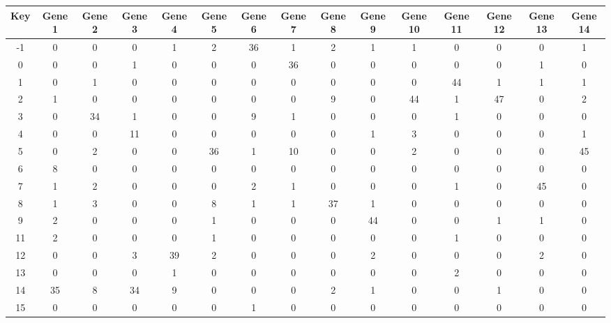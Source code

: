 \begin{tabular}{|c|c|c|c|c|c|c|c|c|c|c|c|c|c|c|}
\hline
Key & Gene 1 & Gene 2 & Gene 3 & Gene 4 & Gene 5 & Gene 6 & Gene 7 & Gene 8 & Gene 9 & Gene 10 & Gene 11 & Gene 12 & Gene 13 & Gene 14 \\
\hline
-1 & 0 & 0 & 0 & 1 & 2 & 36 & 1 & 2 & 1 & 1 & 0 & 0 & 0 & 1 \\
0 & 0 & 0 & 1 & 0 & 0 & 0 & 36 & 0 & 0 & 0 & 0 & 0 & 1 & 0 \\
1 & 0 & 1 & 0 & 0 & 0 & 0 & 0 & 0 & 0 & 0 & 44 & 1 & 1 & 1 \\
2 & 1 & 0 & 0 & 0 & 0 & 0 & 0 & 9 & 0 & 44 & 1 & 47 & 0 & 2 \\
3 & 0 & 34 & 1 & 0 & 0 & 9 & 1 & 0 & 0 & 0 & 1 & 0 & 0 & 0 \\
4 & 0 & 0 & 11 & 0 & 0 & 0 & 0 & 0 & 1 & 3 & 0 & 0 & 0 & 1 \\
5 & 0 & 2 & 0 & 0 & 36 & 1 & 10 & 0 & 0 & 2 & 0 & 0 & 0 & 45 \\
6 & 8 & 0 & 0 & 0 & 0 & 0 & 0 & 0 & 0 & 0 & 0 & 0 & 0 & 0 \\
7 & 1 & 2 & 0 & 0 & 0 & 2 & 1 & 0 & 0 & 0 & 1 & 0 & 45 & 0 \\
8 & 1 & 3 & 0 & 0 & 8 & 1 & 1 & 37 & 1 & 0 & 0 & 0 & 0 & 0 \\
9 & 2 & 0 & 0 & 0 & 1 & 0 & 0 & 0 & 44 & 0 & 0 & 1 & 1 & 0 \\
11 & 2 & 0 & 0 & 0 & 1 & 0 & 0 & 0 & 0 & 0 & 1 & 0 & 0 & 0 \\
12 & 0 & 0 & 3 & 39 & 2 & 0 & 0 & 0 & 2 & 0 & 0 & 0 & 2 & 0 \\
13 & 0 & 0 & 0 & 1 & 0 & 0 & 0 & 0 & 0 & 0 & 2 & 0 & 0 & 0 \\
14 & 35 & 8 & 34 & 9 & 0 & 0 & 0 & 2 & 1 & 0 & 0 & 1 & 0 & 0 \\
15 & 0 & 0 & 0 & 0 & 0 & 1 & 0 & 0 & 0 & 0 & 0 & 0 & 0 & 0 \\
\hline
\end{tabular}